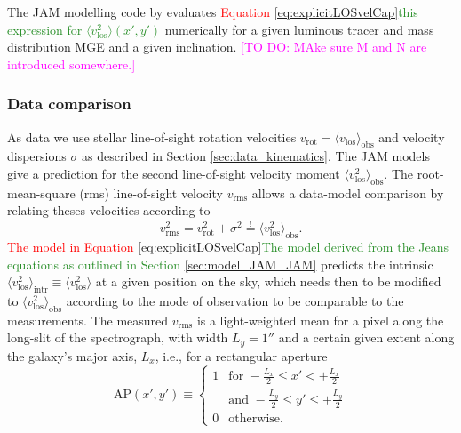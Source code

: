 \documentclass[useAMS,usenatbib]{mnras}
\newcommand{\Wilma}[1]{\textcolor{Magenta}{#1}}
\newcommand{\NEW}[1]{\textcolor{ForestGreen}{#1}}
\newcommand{\OLD}[1]{\textcolor{Red}{#1}}
\begin{document}
The JAM modelling code by \citet{Cap08} evaluates \OLD{Equation \eqref{eq:explicitLOSvelCap}}\NEW{this expression for $\langle v_\text{los}^2\rangle(x',y')$} numerically for a given luminous tracer and mass distribution MGE and a given inclination.
\Wilma{[TO DO: MAke sure M and N are introduced somewhere.]}

\subsubsection{Data comparison} \label{sec:model_JAM_compare}

As data we use stellar line-of-sight rotation velocities $v_\text{rot} = \langle v_\text{los} \rangle_\text{obs}$ and velocity dispersions $\sigma$ as described in Section \ref{sec:data_kinematics}. The JAM models give a prediction for the second line-of-sight velocity moment $\langle v_\text{los}^2 \rangle_\text{obs}$. The root-mean-square (rms) line-of-sight velocity $v_\text{rms}$ allows a data-model comparison by relating theses velocities according to 
\begin{equation}
 v_\text{rms}^2 = v_\text{rot}^2 + \sigma^2  \stackrel{!}{=} \langle v_\text{los}^2 \rangle_\text{obs}.
\end{equation}
\OLD{The model in Equation \eqref{eq:explicitLOSvelCap}}\NEW{The model derived from the Jeans equations as outlined in Section \ref{sec:model_JAM_JAM}} predicts the intrinsic $\langle v_\text{los}^2 \rangle_\text{intr}\equiv\langle v_\text{los}^2\rangle$ at a given position on the sky, which needs then to be modified to $\langle v_\text{los}^2 \rangle_\text{obs}$ according to the mode of observation to be comparable to the measurements. The measured $v_\text{rms}$ is a light-weighted mean for a pixel along the long-slit of the spectrograph, with width $L_y = 1''$ \citep{SWELLSV} and a certain given extent along the galaxy's major axis, $L_x$, i.e., for a rectangular aperture
\begin{equation}
\text{AP}(x',y') \equiv \left\{ \begin{array}{ll} 1 & \text{for } -\frac{L_x}{2} \leq x' < + \frac{L_x}{2}\\
& \text{and } - \frac{L_y}{2} \leq y' \leq + \frac{L_y}{2}  \\ 0 & \text{otherwise.} \end{array} \right.
\end{equation}
\end{document}
